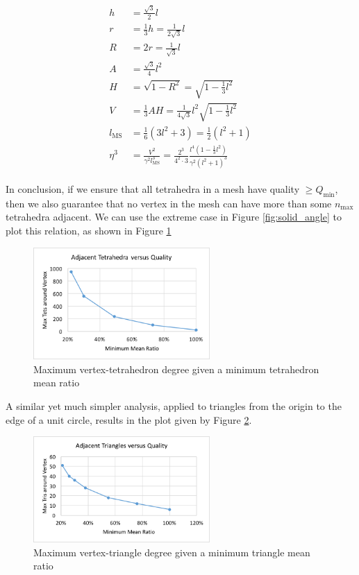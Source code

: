 \begin{gather} \label{eq:solid_angle_qual}
\begin{split}
h &= \tfrac{\sqrt{3}}{2}l \\
r &= \tfrac13 h = \tfrac{1}{2\sqrt{3}}l \\
R &= 2r = \tfrac{1}{\sqrt{3}}l \\
A &= \tfrac{\sqrt{3}}{4}l^2 \\
H &= \sqrt{1-R^2} = \sqrt{1-\tfrac13 l^2} \\
V &= \tfrac13 A H = \tfrac{1}{4\sqrt{3}} l^2\sqrt{1-\tfrac13 l^2} \\
l_{\text{MS}} &= \tfrac16(3l^2 + 3) = \tfrac12(l^2 + 1) \\
\eta^3 &= \frac{V^2}{\gamma^2 l_{\text{MS}}^3} =
\frac{2^3}{4^2\cdot 3}\frac{l^4(1-\tfrac13 l^2)}{\gamma^2 (l^2 + 1)^3}
\end{split}
\end{gather}

In conclusion, if we ensure that all tetrahedra in a mesh have
quality $\geq Q_{\text{min}}$, then we also guarantee that no
vertex in the mesh can have more than some $n_{\text{max}}$
tetrahedra adjacent.
We can use the extreme case in Figure \ref{fig:solid_angle}
to plot this relation, as shown in Figure \ref{fig:max_tet_deg}

\begin{figure}
\begin{center}
\includegraphics[width=0.6\textwidth]{max_tet_deg.png}
\caption{Maximum vertex-tetrahedron degree given a minimum tetrahedron mean ratio}
\label{fig:max_tet_deg}
\end{center}
\end{figure}

A similar yet much simpler analysis, applied to triangles
from the origin to the edge of a unit circle, results in the
plot given by Figure \ref{fig:max_tri_deg}.

\begin{figure}
\begin{center}
\includegraphics[width=0.6\textwidth]{max_tri_deg.png}
\caption{Maximum vertex-triangle degree given a minimum triangle mean ratio}
\label{fig:max_tri_deg}
\end{center}
\end{figure}
